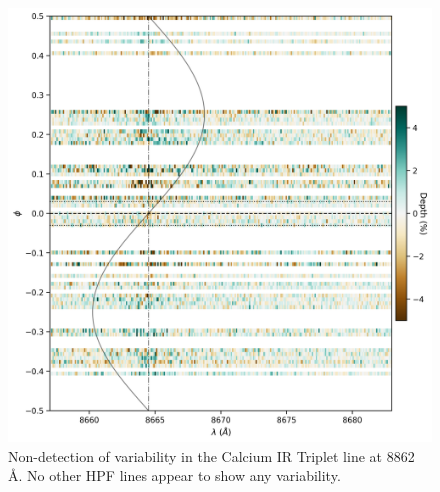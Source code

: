 \documentclass[twocolumn]{aastex631}
\begin{document}
\begin{figure}[b]
    \includegraphics[width=0.5\linewidth]{figures/Ca8662_phase_2D_diagram_resid.png}
    \caption{Non-detection of variability in the Calcium IR Triplet line at 8862 \AA.  No other HPF lines appear to show any variability.}
    \label{fig:CaPhaseScan}
\end{figure}
\end{document}
